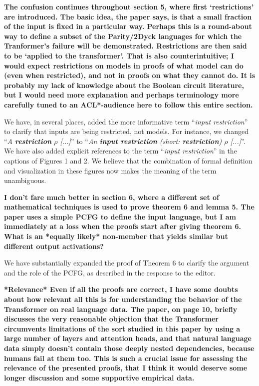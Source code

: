 \documentclass[11pt,a4paper]{article}
\newcounter{theorem}
\newcommand{\key}[1]{\textbf{#1}}
\newcommand\response[1]{{\color{blue}#1}}
\newcommand\newtext[1]{``\textit{#1}''}
\newcommand\original[1]{\textbf{#1}}
\begin{document}
\original{The confusion continues throughout section 5, where first ‘restrictions’
are introduced. The basic idea, the paper says, is that a small fraction of
the input is fixed in a particular way. Perhaps this is a round-about way to
define a subset of the Parity/2Dyck languages for which the Tranformer’s
failure will be demonstrated. Restrictions are then said to be ‘applied to
the transformer’. That is also counterintuitive; I would expect
restrictions on models in proofs of what model can do (even when
restricted), and not in proofs on what they cannot do. It is probably my
lack of knowledge about the Boolean circuit literature, but I would need
more explanation and perhaps terminology more carefully tuned to an
ACL*-audience here to follow this entire section.}

\response{We have, in several places, added the more informative term \newtext{input restriction} to clarify that inputs are being restricted, not models. For instance, we changed \newtext{A \key{restriction} $\rho$ [...]} to \newtext{An \key{input restriction} (short: \key{restriction}) $\rho$ [...]}. We have also added explicit references to the term \newtext{input restriction} in the captions of Figures 1 and 2. We believe that the combination of formal definition and visualization in these figures now makes the meaning of the term unambiguous.}

\original{I don’t fare much better in section 6, where a different set of
mathematical techniques is used to prove theorem 6 and lemma 5. The paper
uses a simple PCFG to define the input language, but I am immediately at a
loss when the proofs start after giving theorem 6. What is an *equally
likely* non-member that yields similar but different output activations?}

\response{We have substantially expanded the proof of Theorem 6 to clarify the argument and the role of the PCFG, as described in the response to the editor.}

\original{*Relevance*
Even if all the proofs are correct, I have some doubts about how relevant
all this is for understanding the behavior of the Transformer on real
language data. The paper, on page 10, briefly discusses the very reasonable
objection that the Transformer circumvents limitations of the sort studied
in this paper by using a large number of layers and attention heads, and
that natural language data simply doesn’t contain those deeply nested
dependencies, because humans fail at them too. This is such a crucial issue
for assessing the relevance of the presented proofs, that I think it would
deserve some longer discussion and some supportive empirical data.}
\end{document}

